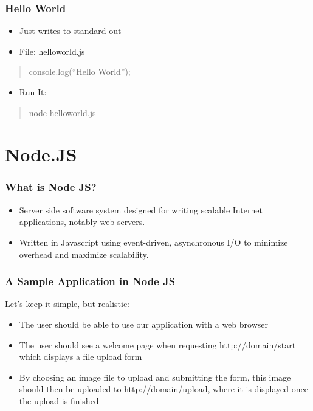 \documentclass[ignorenonframetext,]{beamer}
\begin{document}
\begin{frame}\frametitle{Hello World}

\begin{itemize}
\item
  Just writes to standard out
\item
  File: helloworld.js
\end{itemize}
\begin{quote}
console.log(``Hello World'');

\end{quote}
\begin{itemize}
\item
  Run It:
\end{itemize}
\begin{quote}
node helloworld.js

\end{quote}
\end{frame}

\section{Node.JS}

\begin{frame}\frametitle{What is
\href{http://en.wikipedia.org/wiki/Nodejs}{Node JS}?}

\begin{itemize}
\item
  Server side software system designed for writing scalable Internet
  applications, notably web servers.
\item
  Written in Javascript using event-driven, asynchronous I/O to minimize
  overhead and maximize scalability.
\end{itemize}
\end{frame}

\begin{frame}\frametitle{A Sample Application in Node JS}

Let's keep it simple, but realistic:

\begin{itemize}
\item
  The user should be able to use our application with a web browser
\item
  The user should see a welcome page when requesting http://domain/start
  which displays a file upload form
\item
  By choosing an image file to upload and submitting the form, this
  image should then be uploaded to http://domain/upload, where it is
  displayed once the upload is finished
\end{itemize}
\end{frame}
\end{document}

